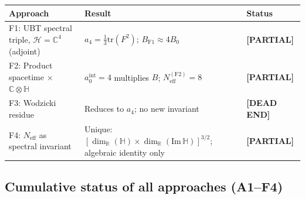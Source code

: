 \documentclass[11pt,a4paper]{article}
\theoremstyle{definition}
\theoremstyle{remark}
\begin{document}
\begin{center}
\begin{tabular}{lll}
  \toprule
  Approach & Result & Status \\
  \midrule
  F1: UBT spectral triple, $\mathcal{H} = \mathbb{C}^4$ (adjoint)
    & $a_4 = \frac{1}{3}\mathrm{tr}(F^2)$; $B_{\mathrm{F1}} \approx 4B_0$
    & \textbf{[PARTIAL]} \\
  F2: Product spacetime $\times$ $\mathbb{C}\otimes\mathbb{H}$
    & $a_0^{\mathrm{int}} = 4$ multiplies $B$; $N_{\mathrm{eff}}^{(\mathrm{F2})} = 8$
    & \textbf{[PARTIAL]} \\
  F3: Wodzicki residue
    & Reduces to $a_4$; no new invariant
    & \textbf{[DEAD END]} \\
  F4: $N_{\mathrm{eff}}$ as spectral invariant
    & Unique: $[\dim_\mathbb{R}(\mathbb{H})\times\dim_\mathbb{R}(\mathrm{Im}\,\mathbb{H})]^{3/2}$;
      algebraic identity only
    & \textbf{[PARTIAL]} \\
  \bottomrule
\end{tabular}
\end{center}

\subsection{Cumulative status of all approaches (A1--F4)}
\end{document}
